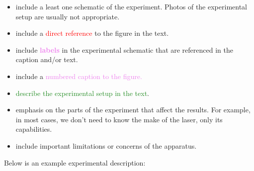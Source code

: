 \documentclass[12pt]{article}
\begin{document}
 \begin{itemize}
  \item include a least one schematic of the experiment. Photos of the
  experimental setup are usually not appropriate.
  \item include a \textcolor{red}{direct reference} to the figure in the text.
  \item include \textcolor{violet}{\bf labels} in the experimental
    schematic that are referenced in the caption and/or text.
  \item include a \textcolor{violet}{numbered caption to the figure.}
  \item \textcolor{ForestGreen}{describe the experimental setup in the text}.
  \item \textcolor{BurntOrange}{emphasis on the parts of the
      experiment that affect the results. For example, in most cases,
      we don't need to know the make of the laser, only its
      capabilities. }
  \item include important \textcolor{Sepia}{limitations or concerns}
    of the apparatus.
 \end{itemize}

  Below is an example experimental description:
\end{document}
